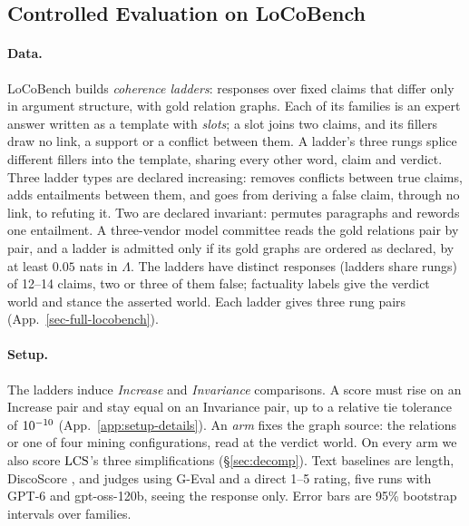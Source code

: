 \subsection{Controlled Evaluation on LoCoBench}
\label{sec:experiments}
\label{sec-experiments}
\label{sec-locobench}

\paragraph{Data.} LoCoBench \citep{anonlocobench} builds \emph{coherence ladders}: responses over
fixed claims that differ only in argument structure, with gold relation graphs. Each of its
\sThreeFamilies{} families is an expert answer written as a template with \emph{slots}; a slot
joins two claims, and its fillers draw no link, a support or a conflict between them. A ladder's three rungs splice different fillers into the template, sharing every other word, claim and
verdict. Three ladder types are declared increasing: 
removes conflicts between true claims,  adds entailments between them, and  goes
from deriving a false claim, through no link, to refuting it. Two are declared invariant: 
permutes paragraphs and  rewords one entailment. A three-vendor model committee reads
the gold relations pair by pair, and a ladder is admitted only if its gold graphs are ordered as
declared, by at least $0.05$ nats in $\Lambda$. The \sThreeLadders{} ladders have \sThreeItems{}
distinct responses (ladders share rungs) of 12--14 claims, two or three of them false; factuality labels give the verdict world and
stance the asserted world. Each ladder gives three rung pairs (App.~\ref{sec-full-locobench}).

\paragraph{Setup.} The ladders induce \sThreeNIncPairs{} \emph{Increase} and \sThreeNInvPairs{}
\emph{Invariance} comparisons. A score must rise on an Increase pair and stay equal on an Invariance pair, up to a
relative tie tolerance of $10^{-10}$ (App.~\ref{app:setup-details}). An \emph{arm} fixes the graph
source: the  relations or one of four mining configurations, read at the verdict world. On
every arm we also score $\mathrm{LCS}$'s three simplifications (\S\ref{sec:decomp}). Text baselines are length,
DiscoScore \citep{discoscore}, and judges using G-Eval \citep{geval} and a direct 1--5 rating, five runs
with GPT-6 and gpt-oss-120b, seeing the response only. Error bars are 95\% bootstrap intervals over
families.

